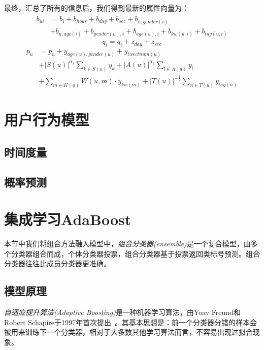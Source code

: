\documentclass[12pt]{article} %
\newcommand\qq{\boldsymbol{\mathit{q}}}
\newcommand\pp{\boldsymbol{\mathit{p}}}
\newcommand\yy{\boldsymbol{\mathit{y}}}
\newcommand\zz{\boldsymbol{\mathit{z}}}
\begin{document}
\begin{sloppypar}
最终，汇总了所有的信息后，我们得到最新的属性向量为：
\begin{align}
\ddot{b}_{ui} &= b_i + b_{hour} + b_{day} + b_{sec} + b_{u,gender(i)} \nonumber\\
&+ b_{u,age(i)} + b_{gender(u),i} + b_{age(u),i} + b_{kw(u,i)} + b_{tag(u,i)}
\end{align}
\begin{equation}
\ddot{\qq}_{i} = \qq_i + \zz_{day} + \zz_{sec}
\end{equation}
\begin{align}
\ddot{\pp}_{u} &= \pp_{u} + \yy_{age(u),gender(u)} + \yy_{tweetnum(u)} \nonumber\\
&+ |S(u)|^{\alpha_1}\sum_{k\in S(u)} \yy_k + |A(u)|^{\alpha_2} \sum_{l\in A(u)} \yy_l \nonumber\\
&+ \sum_{m \in K(u)} W(u,m) \cdot \yy_{kw(m)} + |T(u)|^{-\frac{1}{2}} \sum_{n \in T(u)} \yy_{tag(n)}
\end{align}



\newpage
\section{用户行为模型}

\subsection{时间度量}

\subsection{概率预测}


\newpage
\section{集成学习AdaBoost}

本节中我们将组合方法融入模型中，{\em 组合分类器(ensemble)}是一个复合模型，由多个分类器组合而成，个体分类器投票，组合分类器基于投票返回类标号预测。组合分类器往往比成员分类器更准确。

\subsection{模型原理}

{\em 自适应提升算法(Adaptive Boosting)}是一种机器学习算法，由Yoav Freund和Robert Schapire于1997年首次提出~\cite{freund1997decision}。其基本思想是：前一个分类器分错的样本会被用来训练下一个分类器，相对于大多数其他学习算法而言，不容易出现过拟合现象。


\end{sloppypar}
\end{document}
